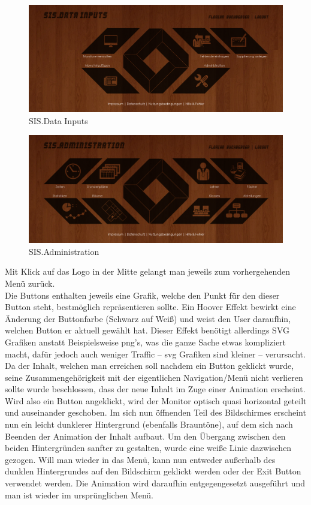 \begin{figure}[H]
\centering
\includegraphics[keepaspectratio=true, width=14cm]{images/screenshots/data-inputs_nohover.png}
\caption{SIS.Data Inputs}
\label{fig:content_draft_design_datainputs}
\end{figure}
\begin{figure}[H]
\centering
\includegraphics[keepaspectratio=true, width=14cm]{images/screenshots/administration_nohover.png}
\caption{SIS.Administration}
\label{fig:content_draft_design_administration}
\end{figure}
Mit Klick auf das Logo in der Mitte gelangt man jeweils zum vorhergehenden Menü zurück.\\
Die Buttons enthalten jeweils eine Grafik, welche den Punkt für den dieser Button steht, bestmöglich repräsentieren sollte. Ein Hoover Effekt bewirkt eine Änderung der Buttonfarbe (Schwarz auf Weiß) und weist den User daraufhin, welchen Button er aktuell gewählt hat. Dieser Effekt benötigt allerdings SVG Grafiken anstatt Beispielsweise png's, was die ganze Sache etwas kompliziert macht, dafür jedoch auch weniger Traffic – svg Grafiken sind kleiner – verursacht.\\
Da der Inhalt, welchen man erreichen soll nachdem ein Button geklickt wurde, seine Zusammengehörigkeit mit der eigentlichen Navigation/Menü nicht verlieren sollte wurde beschlossen, dass der neue Inhalt im Zuge einer Animation erscheint. Wird also ein Button angeklickt, wird der Monitor optisch quasi horizontal geteilt und auseinander geschoben. Im sich nun öffnenden Teil des Bildschirmes erscheint nun ein leicht dunklerer Hintergrund (ebenfalls Brauntöne), auf dem sich nach Beenden der Animation der Inhalt aufbaut. Um den Übergang zwischen den beiden Hintergründen sanfter zu gestalten, wurde eine weiße Linie dazwischen gezogen. Will man wieder in das Menü, kann nun entweder außerhalb des dunklen Hintergrundes auf den Bildschirm geklickt werden oder der Exit Button verwendet werden. Die Animation wird daraufhin entgegengesetzt ausgeführt und man ist wieder im ursprünglichen Menü.\\
